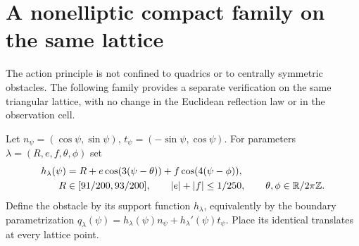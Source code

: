 \section{A nonelliptic compact family on the same lattice}
\label{sec:v37-support-family}
The action principle is not confined to quadrics or to centrally
symmetric obstacles. The following family provides a separate
verification on the same triangular lattice, with no change in the
Euclidean reflection law or in the observation cell.

Let $n_\psi=(\cos\psi,\sin\psi)$, $t_\psi=(-\sin\psi,\cos\psi)$.
For parameters $\lambda=(R,e,f,\theta,\phi)$ set
\begin{align}\label{eq:v37-support-family}
 h_\lambda(\psi)&=R+e\cos(3(\psi-\theta))
                         +f\cos(4(\psi-\phi)),\notag\\
 R&\in[91/200,93/200],\qquad |e|+|f|\le1/250,\qquad
                       \theta,\phi\in\R/2\pi\Z.
\end{align}
Define the obstacle by its support function $h_\lambda$, equivalently
by the boundary parametrization
$q_\lambda(\psi)=h_\lambda(\psi)n_\psi+h_\lambda'(\psi)t_\psi$.
Place its identical translates at every lattice point.

